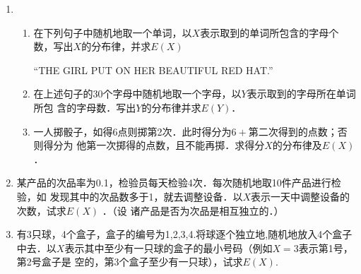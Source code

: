 \documentclass[10pt,a4paper]{article}
\begin{document}
\begin{enumerate}

    


    





    \item \begin{enumerate}
        \item 在下列句子中随机地取一个单词，以$X$表示取到的单词所包含的字母个数，写出$X$的分布律，并求$E(X)$
        \begin{center}
            “THE GIRL PUT ON HER BEAUTIFUL RED HAT.”
        \end{center}
        \item 在上述句子的30个字母中随机地取一个字母，以$Y$表示取到的字母所在单词所包
        含的字母数．写出$Y$的分布律并求$E(Y)$．
        \item 一人掷骰子，如得6点则掷第2次．此时得分为$6+\mbox{第二次得到的点数}$；否则得分为
        他第一次掷得的点数，且不能再掷．求得分$X$的分布律及$E(X)$．
    \end{enumerate}


    \item 某产品的次品率为0.1，检验员每天检验4次．每次随机地取10件产品进行检验，如
    发现其中的次品数多于1，就去调整设备．以$X$表示一天中调整设备的次数，试求$E(X)$ ．（设
    诸产品是否为次品是相互独立的．）



    \item 有3只球，4个盒子，盒子的编号为1,2,3,4.将球逐个独立地,随机地放入4个盒子
    中去．以$X$表示其中至少有一只球的盒子的最小号码（例如$X=3$表示第1号，第2号盒子是
    空的，第3个盒子至少有一只球），试求$E(X)$.



\end{enumerate}
\end{document}
